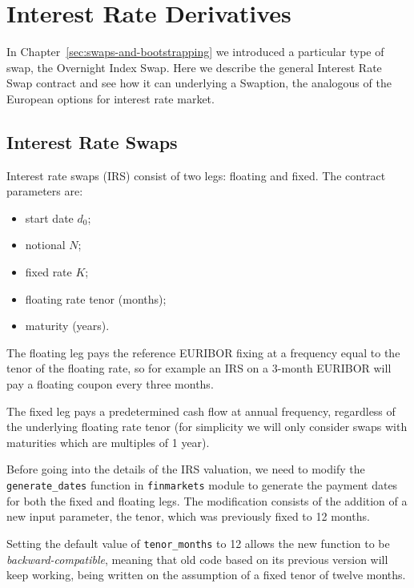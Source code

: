 \chapter{Interest Rate Derivatives}
\label{interest-rate-swaps-and-swaptions}

In Chapter~\ref{sec:swaps-and-bootstrapping} we introduced a particular type of swap, the Overnight Index Swap. Here we describe the general Interest Rate Swap contract and see how it can underlying a Swaption, the analogous of the European options for interest rate market.

\section{Interest Rate Swaps}\label{interest-rate-swaps}

Interest rate swaps (IRS) consist of two legs: floating and fixed. The contract parameters are:

\begin{itemize}
\tightlist
\item
  start date \(d_0\);
\item
  notional \(N\);
\item
  fixed rate \(K\);
\item
  floating rate tenor (months);
\item
  maturity (years).
\end{itemize}

The floating leg pays the reference EURIBOR fixing at a frequency equal to the tenor of the floating rate, so for example an IRS on a 3-month EURIBOR will pay a floating coupon every three months.

The fixed leg pays a predetermined cash flow at annual frequency, regardless of the underlying floating rate tenor (for simplicity we will only consider swaps with maturities which are multiples of 1 year).

\begin{finmarkets}
Before going into the details of the IRS valuation, we need to modify the \texttt{generate\_dates} function in \texttt{finmarkets} module to generate the payment dates for both the fixed and floating legs. 
The modification consists of the addition of a new input parameter, the tenor, which was previously fixed to 12 months.

Setting the default value of \texttt{tenor\_months} to 12 allows the new function to be \emph{backward-compatible}, meaning that old code based on its previous version will keep working, being written on the assumption of a fixed tenor of twelve months. 
\end{finmarkets}

